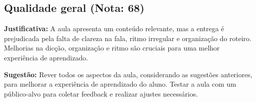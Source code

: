\documentclass{memoir}%
\begin{document}
\subsection*{Qualidade geral (Nota: 68)}%
\textbf{Justificativa:} A aula apresenta um conteúdo relevante, mas a entrega é prejudicada pela falta de clareza na fala, ritmo irregular e organização do roteiro.  Melhorias na dicção, organização e ritmo são cruciais para uma melhor experiência de aprendizado.%
\par%
\textbf{Sugestão:} Rever todos os aspectos da aula, considerando as sugestões anteriores, para melhorar a experiência de aprendizado do aluno.  Testar a aula com um público-alvo para coletar feedback e realizar ajustes necessários.%
\par%
\vspace{0.3cm}

%
\end{document}
